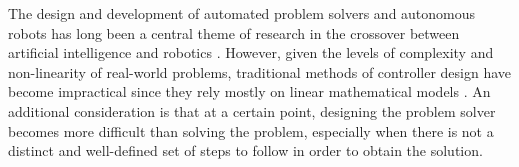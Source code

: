 

The design and development of automated problem solvers and autonomous robots has long been a central theme of research in the crossover between artificial intelligence and robotics \cite{RefWorks:33}. However, given the levels of complexity and non-linearity of real-world problems, traditional methods of controller design have become impractical since they rely mostly on linear mathematical models \cite{RefWorks:32}. An additional consideration is that at a certain point, designing the problem solver becomes more difficult than solving the problem, especially when there is not a distinct and well-defined set of steps to follow in order to obtain the solution.

